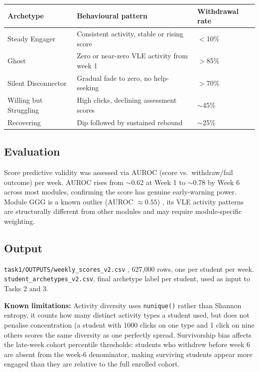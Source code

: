 \documentclass[10pt,a4paper]{article}
\begin{document}
\begin{center}
\small
\begin{tabularx}{0.88\linewidth}{@{}lLl@{}}
\toprule
\textbf{Archetype} & \textbf{Behavioural pattern} & \textbf{Withdrawal rate} \\
\midrule
Steady Engager     & Consistent activity, stable or rising score  & $<$10\% \\
Ghost              & Zero or near-zero VLE activity from week 1   & $>$85\% \\
Silent Disconnector & Gradual fade to zero, no help-seeking        & $>$70\% \\
Willing but Struggling & High clicks, declining assessment scores & $\sim$45\% \\
Recovering         & Dip followed by sustained rebound            & $\sim$25\% \\
\bottomrule
\end{tabularx}
\end{center}

\subsection{Evaluation} Score predictive validity was assessed via AUROC (score vs.\
withdraw/fail outcome) per week. AUROC rises from $\sim$0.62 at Week 1 to $\sim$0.78 by
Week 6 across most modules, confirming the score has genuine early-warning power.
Module GGG is a known outlier (AUROC $\approx 0.55$) , its VLE activity patterns are
structurally different from other modules and may require module-specific weighting.

\subsection{Output} \texttt{task1/OUTPUTS/weekly\_scores\_v2.csv} , 627,000 rows, one per
student per week. \texttt{student\_archetypes\_v2.csv}, final archetype label per student,
used as input to Tasks 2 and 3.

\textbf{Known limitations:} Activity diversity uses \texttt{nunique()} rather than Shannon
entropy, it counts how many distinct activity types a student used, but does not penalise
concentration (a student with 1000 clicks on one type and 1 click on nine others scores the
same diversity as one perfectly spread. Survivorship bias affects the late-week cohort
percentile thresholds: students who withdrew before week 6 are absent from the week-6
denominator, making surviving students appear more engaged than they are relative to the
full enrolled cohort.
\end{document}
